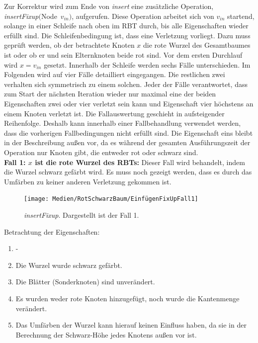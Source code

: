 \documentclass[a4paper,12pt]{article}
\begin{document}
\noindent Zur Korrektur wird zum Ende von \textit{insert} eine zusätzliche Operation,\\  \mbox{\textit{insertFixup}$($Node $v_{in})$}, aufgerufen. Diese Operation arbeitet sich von $v_{in}$ startend, solange in einer Schleife nach oben im RBT durch, bis alle Eigenschaften wieder erfüllt sind. Die Schleifenbedingung ist, dass eine Verletzung vorliegt. Dazu muss geprüft werden, ob der betrachtete Knoten $x$ die rote Wurzel des Gesamtbaumes ist oder ob er und sein Elternknoten beide rot sind. Vor dem ersten Durchlauf wird $x = v_{in}$ gesetzt. Innerhalb der Schleife werden sechs Fälle unterschieden. Im Folgenden wird auf vier Fälle detailliert eingegangen. Die restlichen zwei verhalten sich symmetrisch zu einem solchen. Jeder der Fälle verantwortet, dass zum Start der nächsten Iteration wieder nur maximal eine der beiden Eigenschaften zwei oder vier verletzt sein kann und Eigenschaft vier höchstens an einem Knoten verletzt ist. Die Fallauswertung geschieht in aufsteigender Reihenfolge. Deshalb kann innerhalb einer Fallbehandlung verwendet werden, dass die vorherigen Fallbedingungen nicht erfüllt sind. Die Eigenschaft eins bleibt in der Beschreibung außen vor, da es während der gesamten Ausführungszeit der Operation nur Knoten gibt, die entweder rot oder schwarz sind. \\

\noindent\textbf{Fall 1: $x$ ist die rote Wurzel des RBTs: }
Dieser Fall wird behandelt, indem die Wurzel schwarz gefärbt wird. Es muss noch gezeigt werden, dass es durch das Umfärben zu keiner anderen Verletzung gekommen ist.\\
\begin{figure}[H]
	\centering
	\texttt{[image: Medien/RotSchwarzBaum/EinfügenFixUpFall1]}
	\caption{\textit{insertFixup}. Dargestellt ist der Fall 1.  }
	\label{fig:EinfügenFixUpFall1}
\end{figure}

Betrachtung der Eigenschaften:
\begin{enumerate}
	\item -
	\item Die Wurzel wurde schwarz gefärbt.
	\item Die Blätter (Sonderknoten) sind unverändert.
	\item Es wurden weder rote Knoten hinzugefügt, noch wurde die Kantenmenge verändert. 
	\item Das Umfärben der Wurzel kann hierauf keinen Einfluss haben, da sie in der Berechnung der Schwarz-Höhe jedes Knotens außen vor ist.
\end{enumerate}  
\end{document}
